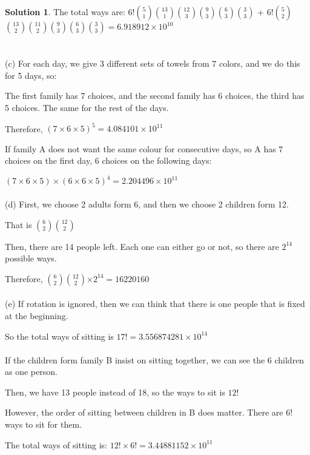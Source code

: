 \documentclass{article}
\theoremstyle{definition}
\newtheorem*{solution}{Solution}
\begin{document}
\begin{solution}
The total ways are: \(6!\)\(5\choose1\)\(13\choose1\)\(12\choose3\)\(9\choose3\)\(6\choose3\)\(3\choose3\) + \(6!\)\(5\choose2\)\(13\choose2\)\(11\choose2\)\(9\choose3\)\(6\choose3\)\(3\choose3\)\( = 6.918912\times10^{10}\)\\\\\\


(c) For each day, we give 3 different sets of towels from 7 colors, and we do this for 5 days, so:

The first family has 7 choices, and the second family has 6 choices, the third has 5 choices. The same for the rest of the days. 

Therefore, \({(7\times6\times5)}^5 = 4.084101\times10^{11}\) 



If family A does not want the same colour for consecutive days, so A has 7 choices on the first day, 6 choices on the following days:

\((7\times6\times5) \times {(6\times6\times5)}^4\)\(= 2.204496\times10^{11}\)\\\\

(d) First, we choose 2 adults form 6, and then we choose 2 children form 12.

That is \(6\choose2\)\(12\choose2\)

Then, there are 14 people left. Each one can either go or not, so there are \(2^{14}\) possible ways.

Therefore, \(6\choose2\)\(12\choose2\)\(\times 2^{14} = 16220160\)\\\\

(e) If rotation is ignored, then we can think that there is one people that is fixed at the beginning.

So the total ways of sitting is \(17! = 3.556874281\times10^{14}\)\\\\

If the children form family B insist on sitting together, we can see the 6 children as one person.

Then, we have 13 people instead of 18, so the ways to sit is \(12!\)

However, the order of sitting between children in B does matter. There are \(6!\) ways to sit for them.

The total ways of sitting is: \(12!\times6! = 3.44881152\times 10^{11}\)\\\\


\end{solution}
\end{document}
